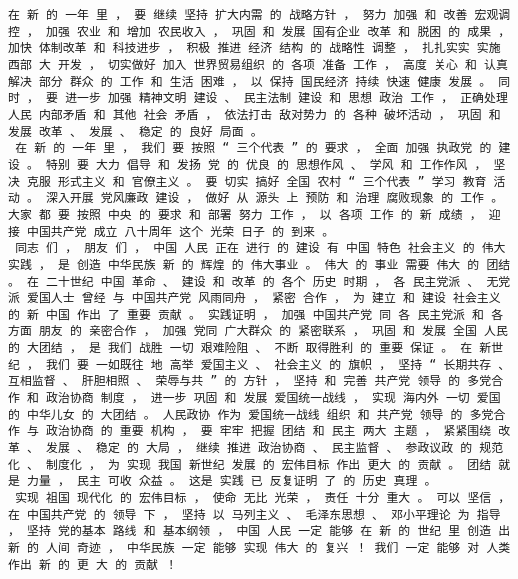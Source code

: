 \documentclass{article}
\begin{document}
\begin{Verbatim}[commandchars=\\\{\}]
 在 新 的 一年 里 ， 要 继续 坚持 扩大内需 的 战略方针 ， 努力 加强 和 改善 宏观调控 ， 加强 农业 和 增加 农民收入 ， 巩固 和 发展 国有企业 改革 和 脱困 的 成果 ， 加快 体制改革 和 科技进步 ， 积极 推进 经济 结构 的 战略性 调整 ， 扎扎实实 实施 西部 大 开发 ， 切实做好 加入 世界贸易组织 的 各项 准备 工作 ， 高度 关心 和 认真 解决 部分 群众 的 工作 和 生活 困难 ， 以 保持 国民经济 持续 快速 健康 发展 。 同时 ， 要 进一步 加强 精神文明 建设 、 民主法制 建设 和 思想 政治 工作 ， 正确处理 人民 内部矛盾 和 其他 社会 矛盾 ， 依法打击 敌对势力 的 各种 破坏活动 ， 巩固 和 发展 改革 、 发展 、 稳定 的 良好 局面 。 
 在 新 的 一年 里 ， 我们 要 按照 “ 三个代表 ” 的 要求 ， 全面 加强 执政党 的 建设 。 特别 要 大力 倡导 和 发扬 党 的 优良 的 思想作风 、 学风 和 工作作风 ， 坚决 克服 形式主义 和 官僚主义 。 要 切实 搞好 全国 农村 “ 三个代表 ” 学习 教育 活动 。 深入开展 党风廉政 建设 ， 做好 从 源头 上 预防 和 治理 腐败现象 的 工作 。 大家 都 要 按照 中央 的 要求 和 部署 努力 工作 ， 以 各项 工作 的 新 成绩 ， 迎接 中国共产党 成立 八十周年 这个 光荣 日子 的 到来 。 
 同志 们 ， 朋友 们 ， 中国 人民 正在 进行 的 建设 有 中国 特色 社会主义 的 伟大 实践 ， 是 创造 中华民族 新 的 辉煌 的 伟大事业 。 伟大 的 事业 需要 伟大 的 团结 。 在 二十世纪 中国 革命 、 建设 和 改革 的 各个 历史 时期 ， 各 民主党派 、 无党派 爱国人士 曾经 与 中国共产党 风雨同舟 ， 紧密 合作 ， 为 建立 和 建设 社会主义 的 新 中国 作出 了 重要 贡献 。 实践证明 ， 加强 中国共产党 同 各 民主党派 和 各 方面 朋友 的 亲密合作 ， 加强 党同 广大群众 的 紧密联系 ， 巩固 和 发展 全国 人民 的 大团结 ， 是 我们 战胜 一切 艰难险阻 、 不断 取得胜利 的 重要 保证 。 在 新世纪 ， 我们 要 一如既往 地 高举 爱国主义 、 社会主义 的 旗帜 ， 坚持 “ 长期共存 、 互相监督 、 肝胆相照 、 荣辱与共 ” 的 方针 ， 坚持 和 完善 共产党 领导 的 多党合作 和 政治协商 制度 ， 进一步 巩固 和 发展 爱国统一战线 ， 实现 海内外 一切 爱国 的 中华儿女 的 大团结 。 人民政协 作为 爱国统一战线 组织 和 共产党 领导 的 多党合作 与 政治协商 的 重要 机构 ， 要 牢牢 把握 团结 和 民主 两大 主题 ， 紧紧围绕 改革 、 发展 、 稳定 的 大局 ， 继续 推进 政治协商 、 民主监督 、 参政议政 的 规范化 、 制度化 ， 为 实现 我国 新世纪 发展 的 宏伟目标 作出 更大 的 贡献 。 团结 就是 力量 ， 民主 可收 众益 。 这是 实践 已 反复证明 了 的 历史 真理 。 
 实现 祖国 现代化 的 宏伟目标 ， 使命 无比 光荣 ， 责任 十分 重大 。 可以 坚信 ， 在 中国共产党 的 领导 下 ， 坚持 以 马列主义 、 毛泽东思想 、 邓小平理论 为 指导 ， 坚持 党的基本 路线 和 基本纲领 ， 中国 人民 一定 能够 在 新 的 世纪 里 创造 出新 的 人间 奇迹 ， 中华民族 一定 能够 实现 伟大 的 复兴 ！ 我们 一定 能够 对 人类 作出 新 的 更 大 的 贡献 ！ 

\end{Verbatim}
\end{document}

